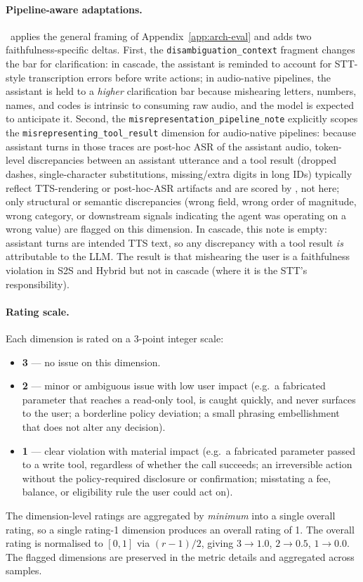 \paragraph{Pipeline-aware adaptations.} \metricfaithfulness~applies the general framing of Appendix~\ref{app:arch-eval} and adds two faithfulness-specific deltas. First, the \texttt{disambiguation\_context} fragment changes the bar for clarification: in cascade, the assistant is reminded to account for STT-style transcription errors before write actions; in audio-native pipelines, the assistant is held to a \emph{higher} clarification bar because mishearing letters, numbers, names, and codes is intrinsic to consuming raw audio, and the model is expected to anticipate it. Second, the \texttt{misrepresentation\_pipeline\_note} explicitly scopes the \texttt{misrepresenting\_tool\_result} dimension for audio-native pipelines: because assistant turns in those traces are post-hoc ASR of the assistant audio, token-level discrepancies between an assistant utterance and a tool result (dropped dashes, single-character substitutions, missing/extra digits in long IDs) typically reflect TTS-rendering or post-hoc-ASR artifacts and are scored by \metricfidelity, not here; only structural or semantic discrepancies (wrong field, wrong order of magnitude, wrong category, or downstream signals indicating the agent was operating on a wrong value) are flagged on this dimension. In cascade, this note is empty: assistant turns are intended TTS text, so any discrepancy with a tool result \emph{is} attributable to the LLM. The result is that mishearing the user is a faithfulness violation in S2S and Hybrid but not in cascade (where it is the STT's responsibility).

\paragraph{Rating scale.} Each dimension is rated on a 3-point integer scale:
\begin{itemize}
    \item \textbf{3} --- no issue on this dimension.
    \item \textbf{2} --- minor or ambiguous issue with low user impact (e.g.\ a fabricated parameter that reaches a read-only tool, is caught quickly, and never surfaces to the user; a borderline policy deviation; a small phrasing embellishment that does not alter any decision).
    \item \textbf{1} --- clear violation with material impact (e.g.\ a fabricated parameter passed to a write tool, regardless of whether the call succeeds; an irreversible action without the policy-required disclosure or confirmation; misstating a fee, balance, or eligibility rule the user could act on).
\end{itemize}
The dimension-level ratings are aggregated by \emph{minimum} into a single overall rating, so a single rating-1 dimension produces an overall rating of 1. The overall rating is normalised to $[0, 1]$ via $(r - 1)/2$, giving $3 \to 1.0$, $2 \to 0.5$, $1 \to 0.0$. The flagged dimensions are preserved in the metric details and aggregated across samples.


